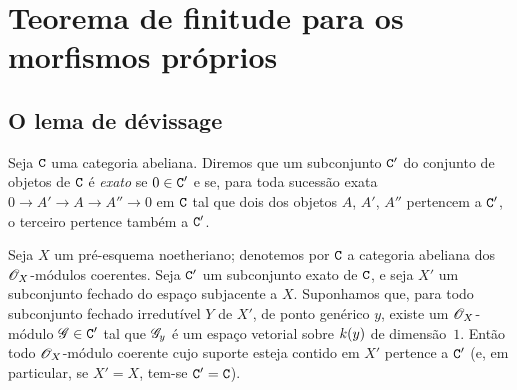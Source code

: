 \section{Teorema de finitude para os morfismos próprios}
\label{section:III.3}

\subsection{O lema de d\'evissage}
\label{subsection:III.3.1}

\begin{definition}[3.1.1]
\label{III.3.1.1}
Seja $\mathtt{C}$ uma categoria abeliana.
Diremos que um subconjunto $\mathtt{C}'$ do conjunto de objetos de $\mathtt{C}$ é \emph{exato} se $0\in\mathtt{C}'$ e se, para toda sucessão exata $0\to A'\to A\to A''\to 0$ em $\mathtt{C}$ tal que dois dos objetos $A$, $A'$, $A''$ pertencem a $\mathtt{C}'$, o terceiro pertence também a $\mathtt{C}'$.
\end{definition}

\begin{theorem}[3.1.2]
\label{III.3.1.2}
Seja $X$ um pré-esquema noetheriano; denotemos por $\mathtt{C}$ a categoria abeliana dos $\mathscr{O}_X$-módulos coerentes.
Seja $\mathtt{C}'$ um subconjunto exato de $\mathtt{C}$, e seja $X'$ um subconjunto fechado do espaço subjacente a $X$.
Suponhamos que, para todo subconjunto fechado irredutível $Y$ de $X'$, de ponto genérico $y$, existe um $\mathscr{O}_X$-módulo $\mathscr{G}\in\mathtt{C}'$ tal que $\mathscr{G}_y$ é um espaço vetorial sobre $k(y)$ de dimensão~$1$.
Então todo $\mathscr{O}_X$-módulo coerente cujo suporte esteja contido em $X'$ pertence a $\mathtt{C}'$ (e, em particular, se $X'=X$, tem-se $\mathtt{C}'=\mathtt{C}$).
\end{theorem}

